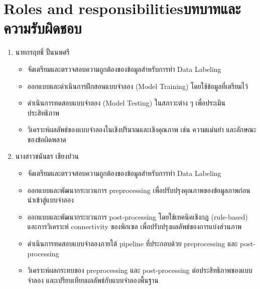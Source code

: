 \section{\ifenglish Roles and responsibilities\else บทบาทและความรับผิดชอบ\fi}
\begin{enumerate}
    \item นายกรฤทธิ์ ปั้นนพศรี
        \begin{itemize}
            \item จัดเตรียมและตรวจสอบความถูกต้องของข้อมูลสำหรับการทำ Data Labeling
            \item ออกแบบและดำเนินการฝึกสอนแบบจำลอง (Model Training) โดยใช้ข้อมูลที่เตรียมไว้
            \item ดำเนินการทดสอบแบบจำลอง (Model Testing) ในสภาวะต่าง ๆ เพื่อประเมินประสิทธิภาพ
            \item วิเคราะห์ผลลัพธ์ของแบบจำลองในเชิงปริมาณและเชิงคุณภาพ เช่น ความแม่นยำ และลักษณะของข้อผิดพลาด
        \end{itemize}
    \item นางสาวชนันธร เชียงปวน
        \begin{itemize}
            \item จัดเตรียมและตรวจสอบความถูกต้องของข้อมูลสำหรับการทำ Data Labeling
            \item ออกแบบและพัฒนากระบวนการ preprocessing เพื่อปรับปรุงคุณภาพของข้อมูลภาพก่อนนำเข้าสู่แบบจำลอง
            \item ออกแบบและพัฒนากระบวนการ post-processing โดยใช้เทคนิคเชิงกฎ (rule-based) และการวิเคราะห์ connectivity ของพิกเซล เพื่อปรับปรุงผลลัพธ์ของการแบ่งส่วนภาพ
            \item ดำเนินการทดสอบแบบจำลองภายใต้ pipeline ที่ประกอบด้วย preprocessing และ post-processing
            \item วิเคราะห์ผลกระทบของ preprocessing และ post-processing ต่อประสิทธิภาพของแบบจำลอง และเปรียบเทียบผลลัพธ์กับแบบจำลองพื้นฐาน
        \end{itemize}
\end{enumerate}

